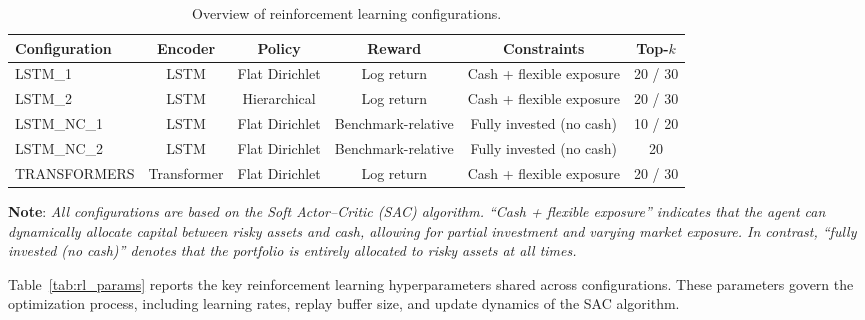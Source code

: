 \documentclass[]{elsarticle}
\begin{document}
\begin{table}[H]
\centering
\small
\setlength{\tabcolsep}{3pt}   %
\renewcommand{\arraystretch}{1.1}
\begin{tabular}{lccccc}
\toprule
\textbf{Configuration} & \textbf{Encoder} & \textbf{Policy} & \textbf{Reward} & \textbf{Constraints} & \textbf{Top-\(k\)} \\
\midrule
LSTM\_1 & LSTM & Flat Dirichlet & Log return & Cash + flexible exposure & 20 / 30 \\
LSTM\_2 & LSTM & Hierarchical & Log return & Cash + flexible exposure & 20 / 30 \\
LSTM\_NC\_1 & LSTM & Flat Dirichlet & Benchmark-relative & Fully invested (no cash) & 10 / 20 \\
LSTM\_NC\_2 & LSTM & Flat Dirichlet & Benchmark-relative & Fully invested (no cash) & 20 \\
TRANSFORMERS & Transformer & Flat Dirichlet & Log return & Cash + flexible exposure & 20 / 30 \\
\bottomrule
\end{tabular}
\caption{Overview of reinforcement learning configurations.}
\label{tab:config_overview}
\end{table}
\begin{center}
\vspace{-0.4cm}
\linespread{0.65}\selectfont
{\scriptsize \textbf{Note}: \textit{All configurations are based on the Soft Actor--Critic (SAC) algorithm. “Cash + flexible exposure” indicates that the agent can dynamically allocate capital between risky assets and cash, allowing for partial investment and varying market exposure. In contrast, “fully invested (no cash)” denotes that the portfolio is entirely allocated to risky assets at all times.}}
\end{center}

\linespread{1.5}\selectfont

Table~\ref{tab:rl_params} reports the key reinforcement learning hyperparameters shared across configurations. These parameters govern the optimization process, including learning rates, replay buffer size, and update dynamics of the SAC algorithm.
\end{document}
